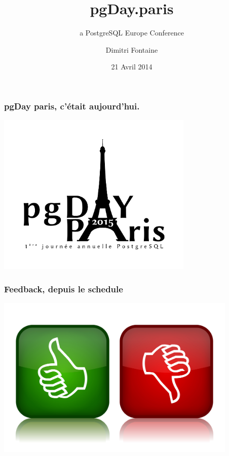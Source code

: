 \documentclass{beamer}
\title{pgDay.paris}
\subtitle{a PostgreSQL Europe Conference}
\author{Dimitri Fontaine}
\date{21 Avril 2014}
\begin{document}
\frame{\titlepage}

\begin{frame}[fragile]
  \frametitle{pgDay paris, c'était aujourd'hui.}

  \begin{center}
    \includegraphics[height=21em]{pgdayparis.png}
  \end{center}
\end{frame}

\begin{frame}[fragile]
  \frametitle{Feedback, depuis le schedule}

  \begin{center}
    \includegraphics[height=21em]{Feedbackimage.jpg}
  \end{center}
\end{frame}
\end{document}

